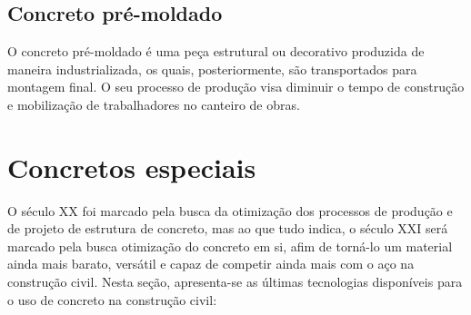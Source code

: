 \subsection{Concreto pré-moldado}

O concreto pré-moldado é uma peça estrutural ou decorativo produzida de maneira industrializada, os quais, posteriormente, são transportados para montagem final. O seu processo de produção visa diminuir o tempo de construção e mobilização de trabalhadores no canteiro de obras.
 
\section{Concretos especiais}

O século XX foi marcado pela busca da otimização dos processos de produção e de projeto de estrutura de concreto, mas ao que tudo indica, o século XXI será marcado pela busca otimização do concreto em si, afim de torná-lo um material ainda mais barato, versátil e capaz de competir ainda mais com o aço na construção civil. Nesta seção, apresenta-se as últimas tecnologias disponíveis para o uso de concreto na construção civil:

